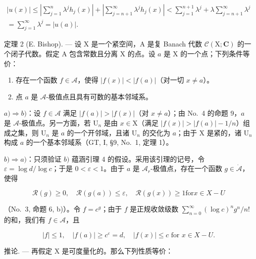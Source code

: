 \[
\begin{array}{l} | u (x) | \leqslant \left| \sum_ {j = 1} ^ {n} \lambda^ {j} h _ {j} (x) \right| + \left| \sum_ {j = n + 1} ^ {\infty} \lambda^ {j} h _ {j} (x) \right| <   \sum_ {j = 1} ^ {n + 1} \lambda^ {j} + \lambda \sum_ {j = n + 1} ^ {\infty} \lambda^ {j} \\ = \sum_ {j = 1} ^ {\infty} \lambda^ {j} = | u (a) |. \end{array}
\]

定理 2 (E. Bishop). --- 设 X 是一个紧空间，A 是复 Banach 代数 \(\mathcal{C}(\mathrm{X};\mathbf{C})\) 的一个闭子代数。假定 A 包含常数且分离 X 的点。设 \(a\) 是 X 的一个点；下列条件等价：

\begin{enumerate}
\def\labelenumi{\alph{enumi})}
\item
  存在一个函数 \(f \in \mathcal{A}\)，使得 \(|f(x)| < |f(a)|\)（对一切 \(x \neq a\)）。
\item
  点 \(a\) 是 \(\mathcal{A}\)-极值点且具有可数的基本邻域系。
\end{enumerate}

\(a) \Rightarrow b)\)：设 \(f \in \mathcal{A}\) 满足 \(|f(a)| > |f(x)|\)（对 \(x \neq a\)）；由 No.~4 的命题 9，\(a\) 是 \(\mathcal{A}\)-极值点。另一方面，若 \(\mathrm{U}_n\) 是由 \(x \in \mathrm{X}\)（满足 \(|f(x)| > |f(a)| - 1/n\)）组成之集，则 \(\mathrm{U}_n\) 是 \(a\) 的一个开邻域，且诸 \(\mathrm{U}_n\) 的交化为 \(a\)；由于 \(\mathrm{X}\) 是紧的，诸 \(\mathrm{U}_n\) 构成 \(a\) 的一个基本邻域系（GT, I, §9, No.~1, 定理 1）。

\(b) \Rightarrow a)\)：只须验证 \(b)\) 蕴涵引理 4 的假设。采用该引理的记号，令 \(\varepsilon = \log d / \log c\)；于是 \(0 < \varepsilon < 1\)。由于 \(a\) 是 \(\mathcal{A}_r\)-极值点，存在一个函数 \(g \in \dot{\mathcal{A}}\)，使得

\[
\mathcal {R} (g) \geqslant 0, \quad \mathcal {R} (g (a)) \leqslant \varepsilon , \quad \mathcal {R} (g (x)) \geqslant 1 \text {for} x \in X - U
\]

（No.~3, 命题 6, b)）。令 \(f = c^g\)；由于 \(f\) 是正规收敛级数 \(\sum_{n=0}^{\infty} (\log c)^n g^n / n!\) 的和，我们有 \(f \in \mathcal{A}\)，且

\[
| f | \leqslant 1, \quad | f (a) | \geqslant c ^ {\varepsilon} = d, \quad | f (x) | \leqslant c \text { for } x \in X - U.\tag{Q.E.D.}
\]

推论. --- 再假定 X 是可度量化的。那么下列性质等价：

